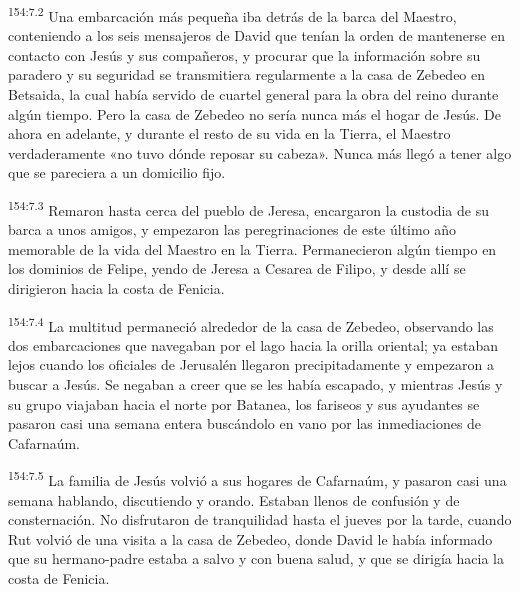 \par 
\textsuperscript{154:7.2} Una embarcación más pequeña iba detrás de la barca del Maestro, conteniendo a los seis mensajeros de David que tenían la orden de mantenerse en contacto con Jesús y sus compañeros, y procurar que la información sobre su paradero y su seguridad se transmitiera regularmente a la casa de Zebedeo en Betsaida, la cual había servido de cuartel general para la obra del reino durante algún tiempo. Pero la casa de Zebedeo no sería nunca más el hogar de Jesús. De ahora en adelante, y durante el resto de su vida en la Tierra, el Maestro verdaderamente «no tuvo dónde reposar su cabeza». Nunca más llegó a tener algo que se pareciera a un domicilio fijo.

\par 
\textsuperscript{154:7.3} Remaron hasta cerca del pueblo de Jeresa, encargaron la custodia de su barca a unos amigos, y empezaron las peregrinaciones de este último año memorable de la vida del Maestro en la Tierra. Permanecieron algún tiempo en los dominios de Felipe, yendo de Jeresa a Cesarea de Filipo, y desde allí se dirigieron hacia la costa de Fenicia.

\par 
\textsuperscript{154:7.4} La multitud permaneció alrededor de la casa de Zebedeo, observando las dos embarcaciones que navegaban por el lago hacia la orilla oriental; ya estaban lejos cuando los oficiales de Jerusalén llegaron precipitadamente y empezaron a buscar a Jesús. Se negaban a creer que se les había escapado, y mientras Jesús y su grupo viajaban hacia el norte por Batanea, los fariseos y sus ayudantes se pasaron casi una semana entera buscándolo en vano por las inmediaciones de Cafarnaúm.

\par 
\textsuperscript{154:7.5} La familia de Jesús volvió a sus hogares de Cafarnaúm, y pasaron casi una semana hablando, discutiendo y orando. Estaban llenos de confusión y de consternación. No disfrutaron de tranquilidad hasta el jueves por la tarde, cuando Rut volvió de una visita a la casa de Zebedeo, donde David le había informado que su hermano-padre estaba a salvo y con buena salud, y que se dirigía hacia la costa de Fenicia.